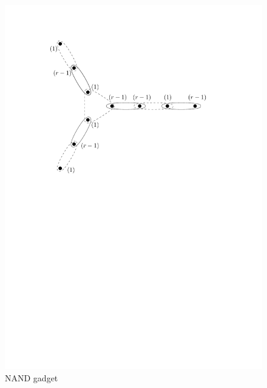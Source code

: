 \documentclass[11pt]{article}
\begin{document}
\begin{figure}[htbp]
\begin{center}
\includegraphics[scale=.6]{figs/nandgadget}
\caption{NAND gadget}
\label{fig:nandgadget}
\end{center}
\end{figure}
\end{document}
